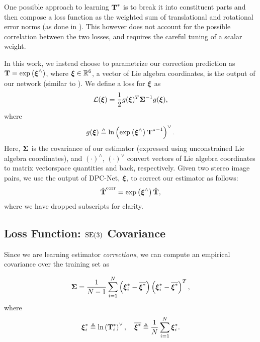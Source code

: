 One possible approach to learning $\boldsymbol{\mathbf{T}}^*$ is to break it into constituent parts and then compose a loss function as the weighted sum of translational and rotational error norms (as done in \cite{Kendall2017-ix, Melekhov2017-dl, Oliveira2017-lt}). This however does not account for the possible correlation between the two losses, and requires the careful tuning of a scalar weight.

In this work, we instead choose to parametrize our correction prediction as $\boldsymbol{\mathbf{T}} = \text{exp}\left({\boldsymbol{\mathbf{\xi}}}^{\wedge}\right)$, where $\boldsymbol{\mathbf{\xi}} \in \mathbb{R}^6$, a vector of Lie algebra coordinates, is the output of our network (similar to \cite{Handa2016-hm}). We define a loss for $\boldsymbol{\mathbf{\xi}}$ as 
\begin{equation}
	\label{eq:se3loss_fn}
\mathcal{L} (\boldsymbol{\mathbf{\xi}}) = \frac{1}{2} g({\boldsymbol{\mathbf{\xi}}})^T {\boldsymbol{\mathbf{\Sigma}}}^{-1} g({\boldsymbol{\mathbf{\xi}}}),
\end{equation} where 
\begin{equation}
	\label{eq:se3logmap_fn}
	g({\boldsymbol{\mathbf{\xi}}}) \triangleq \text{ln}\left({\text{exp}\left({\boldsymbol{\mathbf{\xi}}}^{\wedge}\right) {\boldsymbol{\mathbf{T}}^*}^{-1}} \right)^{\vee}.
\end{equation}
Here, $\boldsymbol{\mathbf{\Sigma}}$ is the covariance of our estimator (expressed using unconstrained Lie algebra coordinates), and $(\cdot)^\wedge$, $(\cdot)^\vee$ convert vectors of Lie algebra coordinates to matrix vectorspace quantities and back, respectively.
Given two stereo image pairs, we use the output of DPC-Net, $\boldsymbol{\mathbf{\xi}}$, to correct our estimator as follows:
\begin{align}
	\hat{\boldsymbol{\mathbf{T}}}^{\mathrm{corr}} = \text{exp}\left({\boldsymbol{\mathbf{\xi}}}^{\wedge}\right) \hat{\boldsymbol{\mathbf{T}}},
\end{align}
where we have dropped subscripts for clarity.

\subsection{Loss Function: $\mathrm{SE}(3)$ Covariance}

Since we are learning estimator \textit{corrections}, we can compute an empirical covariance over the training set as

\begin{equation}
\boldsymbol{\mathbf{\Sigma}} = \frac{1}{N-1} \sum_{i=1}^{N} \left( \boldsymbol{\mathbf{\xi}}^*_i -\overline{\boldsymbol{\mathbf{\xi}}^*} \right) \left( \boldsymbol{\mathbf{\xi}}^*_i -\overline{\boldsymbol{\mathbf{\xi}}^*} \right)^T,
\end{equation}
where 
\begin{equation}
	\boldsymbol{\mathbf{\xi}}^*_i \triangleq \text{ln}\left({\boldsymbol{\mathbf{T}}^*_i} \right)^{\vee}, \quad \overline{\boldsymbol{\mathbf{\xi}}^*} \triangleq \frac{1}{N} \sum_{i=1}^N \boldsymbol{\mathbf{\xi}}^*_i.
\end{equation}

